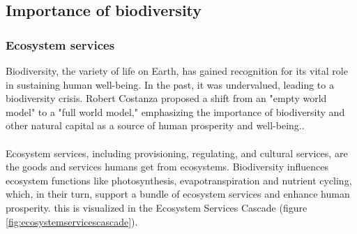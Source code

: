 \documentclass[../summary.tex]{subfiles}
\begin{document}
\subsection{Importance of biodiversity}
\subsubsection{Ecosystem services}

Biodiversity, the variety of life on Earth, has gained recognition for its vital role in sustaining human well-being. In the past, it was undervalued, leading to a biodiversity crisis. Robert Costanza proposed a shift from an "empty world model" to a "full world model," emphasizing the importance of biodiversity and other natural capital as a source of human prosperity and well-being..\\
\\
Ecosystem services, including provisioning, regulating, and cultural services, are the goods and services humans get from ecosystems. Biodiversity influences ecosystem functions like photosynthesis, evapotranspiration and nutrient cycling, which, in their turn, support a bundle of ecosystem services and enhance human prosperity. this is visualized in the Ecosystem Services Cascade (figure \ref{fig:ecosystemservicescascade}).
\end{document}

